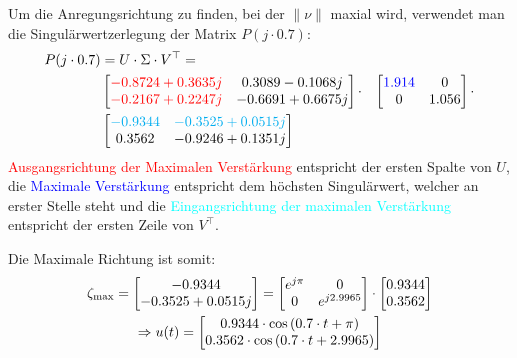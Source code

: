         Um die Anregungsrichtung zu finden, bei der $\|\nu\|$ maxial wird, verwendet man die Singulärwertzerlegung der Matrix $P(j\cdot0.7)$:
        \begin{align*}
            P(j\cdot0.7) &= U\cdot\Sigma\cdot V^\top = \\ 
           &\begin{bmatrix}
           \textcolor{red}{-0.8724+0.3635j}  &   0.3089-0.1068j\\
           \textcolor{red}{-0.2167+0.2247j}  &   -0.6691+0.6675j
           \end{bmatrix}
           \cdot
           &\begin{bmatrix}
           \textcolor{blue}{1.914}    &   0\\
           0        &   1.056
           \end{bmatrix}
           \cdot\\
           &\begin{bmatrix}
           \textcolor{cyan}{-0.9344}  &   \textcolor{cyan}{-0.3525+0.0515j}\\
           0.3562   &   -0.9246+0.1351j
           \end{bmatrix}
        \end{align*}
        \textcolor{red}{Ausgangsrichtung der Maximalen Verstärkung} entspricht der ersten Spalte von $U$, die \textcolor{blue}{Maximale Verstärkung} entspricht dem höchsten Singulärwert, welcher an erster Stelle steht und die \textcolor{cyan}{Eingangsrichtung der maximalen Verstärkung} entspricht der ersten Zeile von $V^\top$.
        
        Die Maximale Richtung ist somit:
        \begin{gather*}
            \zeta_\textnormal{max} = 
            \begin{bmatrix}
            -0.9344\\ -0.3525+0.0515j
            \end{bmatrix}
            =
            \begin{bmatrix}
            e^{j\pi} & 0\\
            0 & e^{j2.9965}
            \end{bmatrix}
            \cdot
            \begin{bmatrix}
            0.9344\\ 0.3562
            \end{bmatrix}\\
            \Rightarrow u(t) = 
            \begin{bmatrix}
            0.9344\cdot\cos\left(0.7\cdot t + \pi\right)\\
            0.3562\cdot\cos\left(0.7\cdot t + 2.9965\right)
            \end{bmatrix}
        \end{gather*}
        
